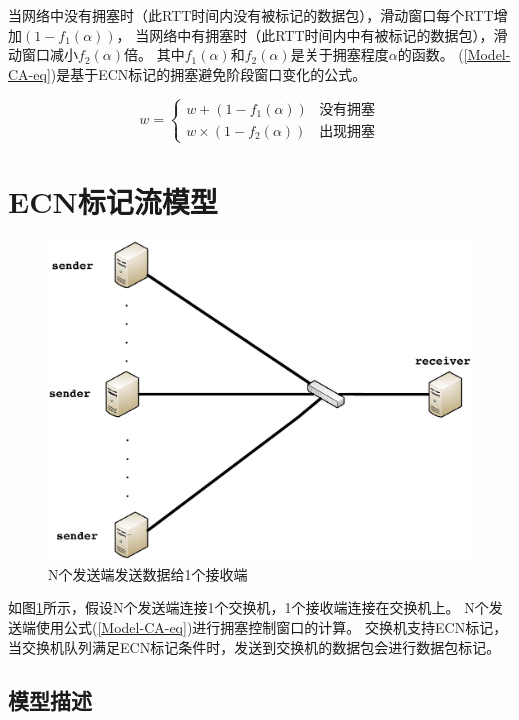 当网络中没有拥塞时（此RTT时间内没有被标记的数据包），滑动窗口每个RTT增加$(1-f_1(\alpha))$，
当网络中有拥塞时（此RTT时间内中有被标记的数据包），滑动窗口减小$f_2(\alpha)$倍。
其中$f_1(\alpha)$和$f_2(\alpha)$是关于拥塞程度$\alpha$的函数。
(\ref{Model-CA-eq})是基于ECN标记的拥塞避免阶段窗口变化的公式。

\begin{equation}
w=
\begin{cases}
w+(1-f_1(\alpha)) &\text{没有拥塞}\\
w \times (1-f_2(\alpha)) &\text{出现拥塞}
\end{cases}
\label{Model-CA-eq}
\end{equation}




\section{ECN标记流模型}\label{cha:model:introduction}




\begin{figure}[H] 
  \centering
  \includegraphics[width=0.9\columnwidth]{figures/others/senders.eps}
  \caption{N个发送端发送数据给1个接收端}
  \label{model-senders-fig}
\end{figure}

如图\ref{model-senders-fig}所示，假设N个发送端连接1个交换机，1个接收端连接在交换机上。
N个发送端使用公式(\ref{Model-CA-eq})进行拥塞控制窗口的计算。
交换机支持ECN标记，当交换机队列满足ECN标记条件时，发送到交换机的数据包会进行数据包标记。

\subsection{模型描述}

